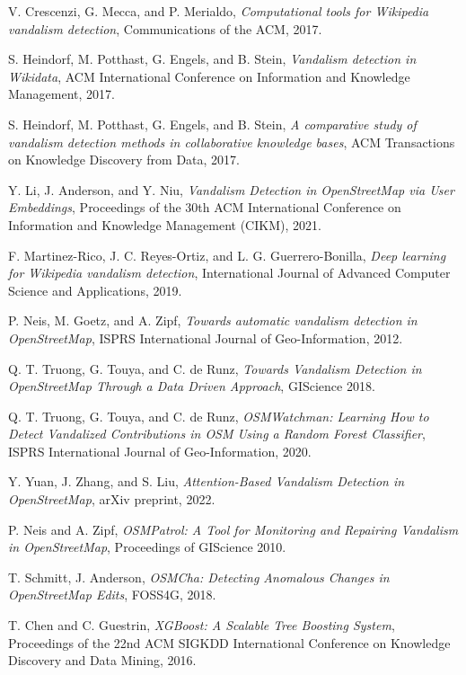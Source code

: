 \documentclass[
    13pt, %
    a4paper, %
    twoside, 
    DIV14, %
    listof=totoc, %
    bibliography=totoc, %
    index=totoc, %
    headsepline
]{scrreprt}
\begin{document}
\begin{thebibliography}{9}
V. Crescenzi, G. Mecca, and P. Merialdo, 
\textit{Computational tools for Wikipedia vandalism detection}, 
Communications of the ACM, 2017.

S. Heindorf, M. Potthast, G. Engels, and B. Stein, 
\textit{Vandalism detection in Wikidata}, 
ACM International Conference on Information and Knowledge Management, 2017.

S. Heindorf, M. Potthast, G. Engels, and B. Stein, 
\textit{A comparative study of vandalism detection methods in collaborative knowledge bases}, 
ACM Transactions on Knowledge Discovery from Data, 2017.

Y. Li, J. Anderson, and Y. Niu, 
\textit{Vandalism Detection in OpenStreetMap via User Embeddings}, 
Proceedings of the 30th ACM International Conference on Information and Knowledge Management (CIKM), 2021.

F. Martinez-Rico, J. C. Reyes-Ortiz, and L. G. Guerrero-Bonilla, 
\textit{Deep learning for Wikipedia vandalism detection}, 
International Journal of Advanced Computer Science and Applications, 2019.

P. Neis, M. Goetz, and A. Zipf, 
\textit{Towards automatic vandalism detection in OpenStreetMap}, 
ISPRS International Journal of Geo-Information, 2012.

Q. T. Truong, G. Touya, and C. de Runz, 
\textit{Towards Vandalism Detection in OpenStreetMap Through a Data Driven Approach}, 
GIScience 2018.

Q. T. Truong, G. Touya, and C. de Runz, 
\textit{OSMWatchman: Learning How to Detect Vandalized Contributions in OSM Using a Random Forest Classifier}, 
ISPRS International Journal of Geo-Information, 2020.

Y. Yuan, J. Zhang, and S. Liu, 
\textit{Attention-Based Vandalism Detection in OpenStreetMap}, 
arXiv preprint, 2022.

P. Neis and A. Zipf, 
\textit{OSMPatrol: A Tool for Monitoring and Repairing Vandalism in OpenStreetMap}, 
Proceedings of GIScience 2010.

T. Schmitt, J. Anderson, 
\textit{OSMCha: Detecting Anomalous Changes in OpenStreetMap Edits}, 
FOSS4G, 2018.

T. Chen and C. Guestrin, 
\textit{XGBoost: A Scalable Tree Boosting System}, 
Proceedings of the 22nd ACM SIGKDD International Conference on Knowledge Discovery and Data Mining, 2016.


\end{thebibliography}
\end{document}
